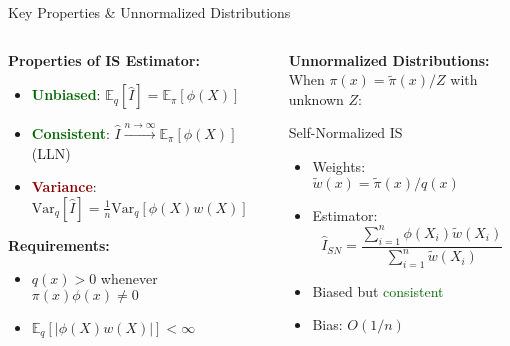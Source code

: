 \documentclass[aspectratio=169]{beamer}
\begin{document}
\begin{frame}{Key Properties \& Unnormalized Distributions}
\begin{columns}
\begin{column}{0.5\textwidth}
\textbf{Properties of IS Estimator:}
\begin{itemize}
\item \textcolor{darkgreen}{\textbf{Unbiased}}: $\mathbb{E}_q[\hat{I}] = \mathbb{E}_\pi[\phi(X)]$
\item \textcolor{darkgreen}{\textbf{Consistent}}: $\hat{I} \xrightarrow{n\to\infty} \mathbb{E}_\pi[\phi(X)]$ (LLN)
\item \textcolor{darkred}{\textbf{Variance}}: $\text{Var}_q[\hat{I}] = \frac{1}{n}\text{Var}_q[\phi(X)w(X)]$
\end{itemize}

\vspace{0.3cm}
\textbf{Requirements:}
\begin{itemize}
\item $q(x) > 0$ whenever $\pi(x)\phi(x) \neq 0$
\item $\mathbb{E}_q[|\phi(X)w(X)|] < \infty$
\end{itemize}
\end{column}

\begin{column}{0.5\textwidth}
\textbf{Unnormalized Distributions:}\\
When $\pi(x) = \tilde{\pi}(x)/Z$ with unknown $Z$:

\begin{block}{Self-Normalized IS}
\begin{itemize}
\item Weights: $\tilde{w}(x) = \tilde{\pi}(x)/q(x)$
\item Estimator: $$\hat{I}_{SN} = \frac{\sum_{i=1}^n \phi(X_i)\tilde{w}(X_i)}{\sum_{i=1}^n \tilde{w}(X_i)}$$
\item Biased but \textcolor{darkgreen}{consistent}
\item Bias: $O(1/n)$
\end{itemize}
\end{block}
\end{column}
\end{columns}
\end{frame}
\end{document}
